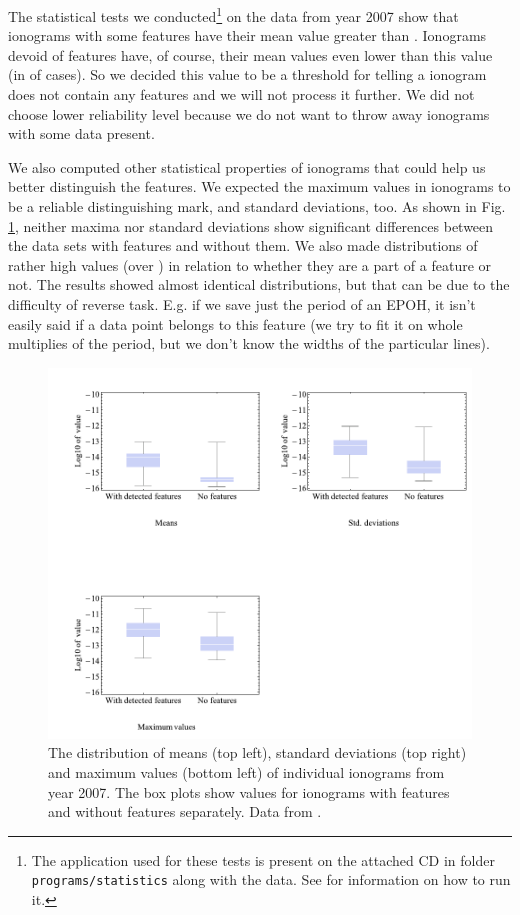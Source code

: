 The statistical tests we conducted\footnote{The application used for these tests is present on the attached CD in folder \texttt{programs/statistics} along with the data. See  for information on how to run it.} on the data from year 2007 show that  ionograms with some features have their mean value greater than . Ionograms devoid of features have, of course, their mean values even lower than this value (in  of cases). So we decided this value to be a threshold for telling a ionogram does not contain any features and we will not process it further. We did not choose lower reliability level because we do not want to throw away ionograms with some data present.

We also computed other statistical properties of ionograms that could help us better distinguish the features. We expected the maximum values in ionograms to be a reliable distinguishing mark, and standard deviations, too. As shown in Fig. \ref{fig:data_stats}, neither maxima nor standard deviations show significant differences between the data sets with features and without them. We also made distributions of rather high values (over ) in relation to whether they are a part of a feature or not. The results showed almost identical distributions, but that can be due to the difficulty of reverse task. E.g. if we save just the period of an EPOH, it isn't easily said if a data point belongs to this feature (we try to fit it on whole multiplies of the period, but we don't know the widths of the particular lines). 

\begin{figure}
	\centering
	\includegraphics[width=140mm]{images/data_stats.pdf}
	\caption{The distribution of means (top left), standard deviations (top right) and maximum values (bottom left) of individual ionograms from year 2007. The box plots show values for ionograms with features and without features separately. Data from \citep{FTP}.}
	\label{fig:data_stats}
\end{figure}

